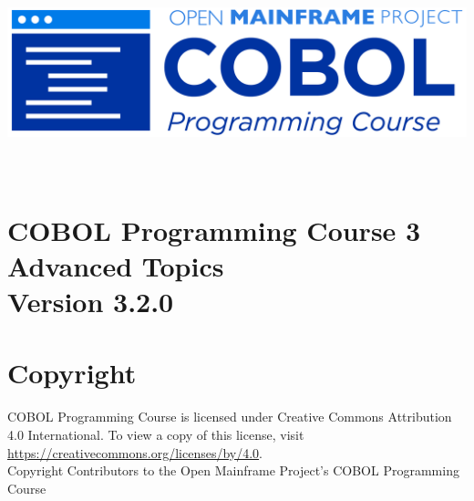 \begin{center}
  \vspace*{25pt}
\includegraphics[width=\textwidth]{Images/COBOL-Programming-Course.png}
\hypertarget{cobol-programming-course-3}{%
\section*{
  \\[35pt]
  \Huge COBOL Programming Course 3 \\[10pt]
  \Huge Advanced Topics \\[15pt]
  \Large Version 3.2.0}\label{cobol-programming-course-3}}
\end{center}

\pagebreak
\hypertarget{copyright}{%
\section*{Copyright}{
  \normalsize COBOL Programming Course is licensed under Creative Commons 
  Attribution 4.0 International. To view a copy of this license, visit 
  \href{https://creativecommons.org/licenses/by/4.0}{https://creativecommons.org/licenses/by/4.0}. \\[10pt]
  Copyright Contributors to the Open Mainframe Project's COBOL Programming Course}\label{copyright}}
\pagebreak